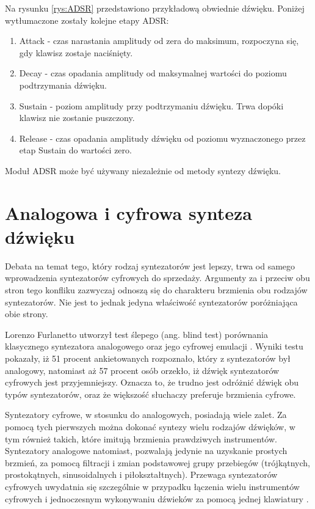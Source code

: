 Na rysunku \ref{rys:ADSR} przedstawiono przykładową obwiednie dźwięku. Poniżej wytłumaczone zostały kolejne etapy ADSR:
\begin{enumerate}
	\item Attack - czas narastania amplitudy od zera do maksimum, rozpoczyna się, gdy klawisz zostaje naciśnięty.
	
	\item Decay - czas opadania amplitudy od maksymalnej wartości do poziomu podtrzymania dźwięku.
	
	\item Sustain - poziom amplitudy przy podtrzymaniu dźwięku. Trwa dopóki klawisz nie zostanie puszczony.
	
	\item Release - czas opadania amplitudy dźwięku od poziomu wyznaczonego przez etap Sustain do wartości zero.
\end{enumerate}
Moduł ADSR może być używany niezależnie od metody syntezy dźwięku.

\section{Analogowa i cyfrowa synteza dźwięku}
Debata na temat tego, który rodzaj syntezatorów jest lepszy, trwa od samego wprowadzenia syntezatorów cyfrowych do sprzedaży. Argumenty za i przeciw obu stron tego konfliku zazwyczaj odnoszą się do charakteru brzmienia obu rodzajów syntezatorów. Nie jest to jednak jedyna właściwość syntezatorów poróżniająca obie strony.

Lorenzo Furlanetto utworzył test ślepego (ang. blind test) porównania klasycznego syntezatora analogowego oraz jego cyfrowej emulacji \cite{synthtopia}. Wyniki testu pokazały, iż 51 procent ankietowanych rozpoznało, który z syntezatorów był analogowy, natomiast aż 57 procent osób orzekło, iż dźwięk syntezatorów cyfrowych jest przyjemniejszy. Oznacza to, że trudno jest odróżnić dźwięk obu typów syntezatorów, oraz że większość słuchaczy preferuje brzmienia cyfrowe.

Syntezatory cyfrowe, w stosunku do analogowych, posiadają wiele zalet. Za pomocą tych pierwszych można dokonać syntezy wielu rodzajów dźwięków, w tym również takich, które imitują brzmienia prawdziwych instrumentów. Syntezatory analogowe natomiast, pozwalają jedynie na uzyskanie prostych brzmień, za pomocą filtracji i zmian podstawowej grupy przebiegów (trójkątnych, prostokątnych, sinusoidalnych i piłokształtnych). 
Przewaga syntezatorów cyfrowych uwydatnia się szczególnie w przypadku łączenia wielu instrumentów cyfrowych i jednoczesnym wykonywaniu dźwieków za pomocą jednej klawiatury \cite{andertons}.


